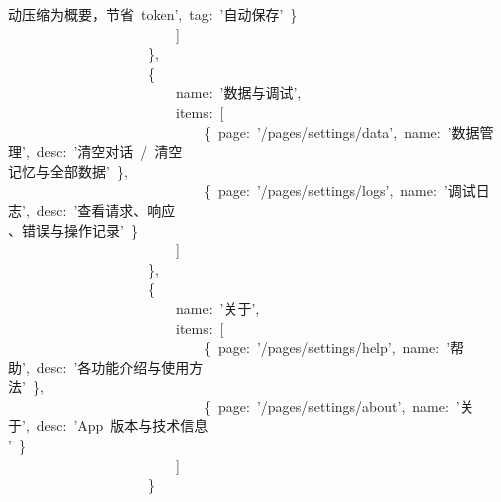 \documentclass[a4paper,10pt]{article}
\begin{document}
{动压缩为概要，节省~token',~tag:~'自动保存'~\}\\
~~~~~~~~~~~~~~~~~~~~~~~~]\\
~~~~~~~~~~~~~~~~~~~~\},\\
~~~~~~~~~~~~~~~~~~~~\{\\
~~~~~~~~~~~~~~~~~~~~~~~~name:~'数据与调试',\\
~~~~~~~~~~~~~~~~~~~~~~~~items:~[\\
~~~~~~~~~~~~~~~~~~~~~~~~~~~~\{~page:~'/pages/settings/data',~name:~'数据管理',~desc:~'清空对话~/~清空\\
记忆与全部数据'~\},\\
~~~~~~~~~~~~~~~~~~~~~~~~~~~~\{~page:~'/pages/settings/logs',~name:~'调试日志',~desc:~'查看请求、响应\\
、错误与操作记录'~\}\\
~~~~~~~~~~~~~~~~~~~~~~~~]\\
~~~~~~~~~~~~~~~~~~~~\},\\
~~~~~~~~~~~~~~~~~~~~\{\\
~~~~~~~~~~~~~~~~~~~~~~~~name:~'关于',\\
~~~~~~~~~~~~~~~~~~~~~~~~items:~[\\
~~~~~~~~~~~~~~~~~~~~~~~~~~~~\{~page:~'/pages/settings/help',~name:~'帮助',~desc:~'各功能介绍与使用方\\
法'~\},\\
~~~~~~~~~~~~~~~~~~~~~~~~~~~~\{~page:~'/pages/settings/about',~name:~'关于',~desc:~'App~版本与技术信息\\
'~\}\\
~~~~~~~~~~~~~~~~~~~~~~~~]\\
~~~~~~~~~~~~~~~~~~~~\}
}

\newpage
\end{document}
